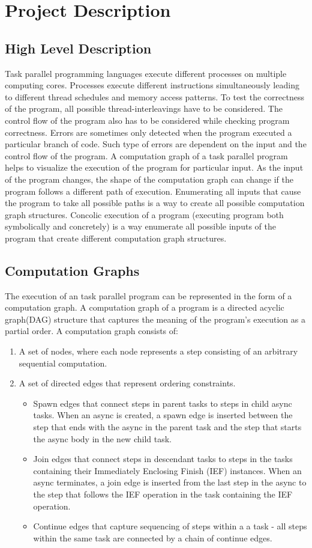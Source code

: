 \section{Project Description}
\subsection{High Level Description}
Task parallel programming languages execute different processes on multiple computing cores. Processes execute different instructions simultaneously leading to different thread schedules and memory access patterns. To test the correctness of the program, all possible thread-interleavings have to be considered. The control flow of the program also has to be considered while checking program correctness. Errors are sometimes only detected when the program executed a particular branch of code. Such type of errors are dependent on the input and the control flow of the program. A computation graph of a task parallel program helps to visualize the execution of the program for particular input. As the input of the program changes, the shape of the computation graph can change if the program follows a different path of execution. Enumerating all inputs that cause the program to take all possible paths is a way to create all possible computation graph structures. Concolic execution of a program (executing program both symbolically and concretely) is a way enumerate all possible inputs of the program that create different computation graph structures.
\subsection{Computation Graphs}
The execution of an task parallel program can be represented in the form of a computation graph. A computation graph of a program is a directed acyclic graph(DAG) structure that captures the meaning of the program's execution as a partial order. A computation graph consists of:
\begin{enumerate}
\item A set of nodes, where each node represents a step consisting of an arbitrary sequential computation. 
\item A set of directed edges that represent ordering constraints. 
\begin{itemize}
 \item Spawn edges that connect steps in parent tasks to steps in child async tasks. When an async is created, a spawn edge is inserted between the step that ends with the async in the parent task and the step that starts the async body in the new child task.
\item Join edges that connect steps in descendant tasks to steps in the tasks containing their Immediately Enclosing Finish (IEF) instances. When an async terminates, a join edge is inserted from the last step in the async to the step that follows the IEF operation in the task containing the IEF operation.
\item Continue edges that capture sequencing of steps within a a task - all steps within the same task are connected by a chain of continue edges.
 \end{itemize} 
\end{enumerate}

